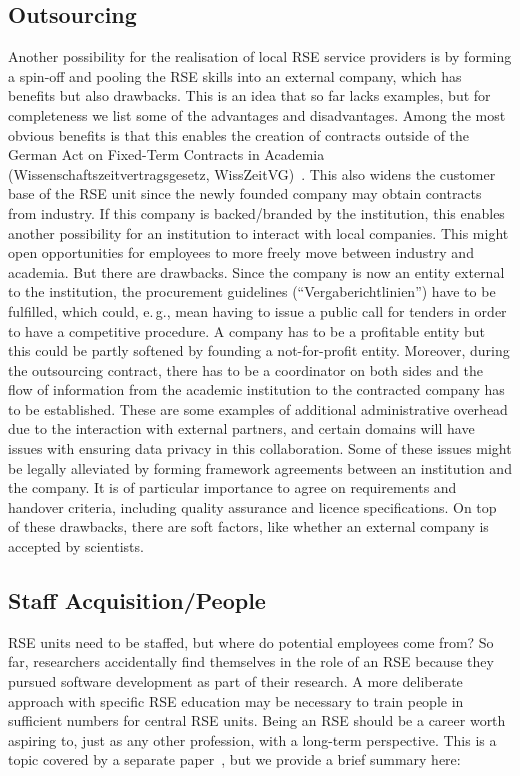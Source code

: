 \documentclass[a4paper]{article}
\newcommand*{\eg}{e.\,g.,\xspace}
\begin{document}
\subsection{Outsourcing}

Another possibility for the realisation of local RSE service providers is by forming a spin-off and pooling the RSE skills into an external company, which has benefits but also drawbacks.
This is an idea that so far lacks examples, but for completeness we list some of the advantages and disadvantages.
Among the most obvious benefits is that this enables the creation of contracts outside of the German Act on Fixed-Term Contracts in Academia (Wissenschaftszeitvertragsgesetz, WissZeitVG)~\cite{Germany2007}.\@
This also widens the customer base of the RSE unit since the newly founded company may obtain contracts from industry.
If this company is backed/branded by the institution, this enables another possibility for an institution to interact with local companies.
This might open opportunities for employees to more freely move between industry and academia.
But there are drawbacks.
Since the company is now an entity external to the institution, the procurement guidelines (“Vergaberichtlinien”) have to be fulfilled, which could, \eg{} mean having to issue a public call for tenders in order to have a competitive procedure.
A company has to be a profitable entity but this could be partly softened by founding a not-for-profit entity.
Moreover, during the outsourcing contract, there has to be a coordinator on both sides and the flow of information from the academic institution to the contracted company has to be established.
These are some examples of additional administrative overhead due to the interaction with external partners, and certain domains will have issues with ensuring data privacy in this collaboration.
Some of these issues might be legally alleviated by forming framework agreements between an institution and the company.
It is of particular importance to agree on requirements and handover criteria, including quality assurance and licence specifications.
On top of these drawbacks, there are soft factors, like whether an external company is accepted by scientists.

\subsection{Staff Acquisition/People}
\label{subsec:staff}
RSE units need to be staffed, but where do potential employees come from?
So far, researchers accidentally find themselves in the role of an RSE because they pursued software development as part of their research.
A more deliberate approach with specific RSE education may be necessary to train people in sufficient numbers for central RSE units.
Being an RSE should be a career worth aspiring to, just as any other profession, with a long-term perspective.
This is a topic covered by a separate paper~\autocite{goth_foundational_competencies_2025}, but we provide a brief summary here:
\end{document}

